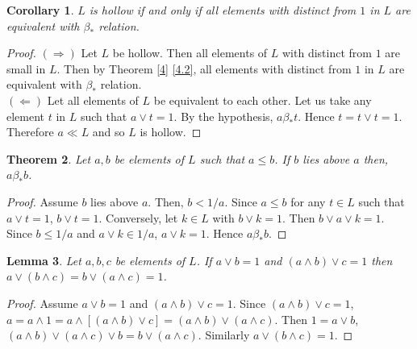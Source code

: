 \documentclass[a4paper,12pt]{article}
\newtheorem{theorem}{Theorem}[section]
\newtheorem{lemma}[theorem]{Lemma}
\newtheorem{corollary}[theorem]{Corollary}
\numberwithin{equation}{section}
\begin{document}
\begin{corollary} \label{5}
  $ L $ is hollow if and only if all elements with distinct from $ 1 $ in $ L $ are equivalent with $ \beta_* $ relation. 
\end{corollary}
\begin{proof}
  $ ( \Rightarrow ) $
  Let $ L $ be hollow. Then all elements of $ L $ with distinct from $ 1 $ are small in $ L $. Then by Theorem \ref{4} \ref{4.2}, 
  all elements with distinct from $ 1 $ in $ L $ are equivalent with $ \beta_* $ relation. \\
  $ ( \Leftarrow ) $ 
  Let all elements of $ L $ be equivalent to each other. Let us take any element $ t $ in $ L $ 
  such that $ a \vee t = 1 $. By the hypothesis, $ a \beta_* t $. Hence $ t = t \vee t = 1 $. 
  Therefore $ a \ll L $ and so $ L $ is hollow. 
\end{proof}
\begin{theorem}\label{6}
  Let $ a,b $ be elements of $ L $ such that $ a \leq b $. 
  If $ b $ lies above $ a $ then, $ a \beta_* b $. 
\end{theorem}
\begin{proof}
  Assume $ b $ lies above $ a $. Then, $ b < 1/a $. Since $ a \leq b $ for any $ t \in L $ such that $ a \vee t = 1 $, $ b \vee t = 1 $. 
  Conversely, let $ k \in L $ with $ b \vee k = 1 $. Then $ b \vee a \vee k = 1 $. Since $ b \leq 1/a $ and $ a \vee k \in 1/a $, $ a \vee k = 1 $. Hence $ a \beta_* b $.


\end{proof}
\begin{lemma}\label{7}
  Let $ a,b,c $ be elements of $ L $.
  If $ a \vee b = 1 $ and $ ( a \wedge b ) \vee c =1 $
  then $ a \vee(b \wedge c)=b \vee ( a \wedge c ) = 1 $.
\end{lemma}
\begin{proof}
  Assume $ a \vee b = 1 $ and $ ( a \wedge b ) \vee c = 1 $. Since $ ( a \wedge b ) \vee c = 1 $, $ a = a \wedge 1 = a \wedge \left[ ( a\wedge b ) \vee c \right]= ( a \wedge b ) \vee ( a \wedge c ) $. Then $ 1 = a\vee b $, 
  $ ( a \wedge b ) \vee ( a \wedge c ) \vee b = b \vee ( a \wedge c )$. Similarly $ a \vee ( b \wedge c ) = 1 $.
\end{proof}
\end{document}
